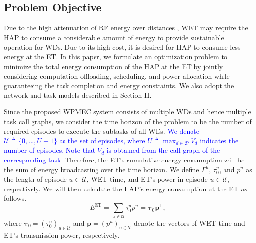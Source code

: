 \documentclass[12pt,draftclsnofoot,onecolumn]{IEEEtran}
\begin{document}
\subsection{Problem Objective}
Due to the high attenuation of RF energy over distances \cite{b8}, WET may require the HAP to consume a considerable amount of energy to provide sustainable operation for WDs. Due to its high cost, it is desired for HAP to consume less energy at the ET. In this paper, we formulate an optimization problem to minimize the total energy consumption of the HAP at the ET by jointly considering computation offloading, scheduling, and power allocation while guaranteeing the task completion and energy constraints. We also adopt the network and task models described in Section II.

Since the proposed WPMEC system consists of multiple WDs and hence multiple task call graphs, we consider the time horizon of the problem to be the number of required episodes to execute the subtasks of all WDs. \textcolor{blue}{We denote $\mathcal{U}\triangleq\{0,...,U-1\}$ as the set of episodes, where $U\triangleq\max_{d\in\mathcal{D}}V_d$  indicates the number of episodes. Note that $V_d$ is obtained from the call graph of the corresponding task.} Therefore, the ET's cumulative energy consumption will be the sum of energy broadcasting over the time horizon. We define $\Gamma^u$, $\tau_0^u$, and $p^u$ as the length of episode $u\in\mathcal{U}$, WET time, and ET's power in episode $u\in\mathcal{U}$, respectively. We will then calculate the HAP's energy consumption at the ET as follows.
\begin{equation}\label{eq2}
	E^{\text{ET}} = \sum_{u\in\mathcal{U}}\tau_0^up^u = \boldsymbol{\tau}_0\boldsymbol{p}^{\intercal},
\end{equation}
where $\boldsymbol{\tau}_0 = \left(\tau_0^u\right)_{u\in\mathcal{U}}$ and $\boldsymbol{p} = \left(p^u\right)_{u\in\mathcal{U}}$ denote the vectors of WET time and ET's transmission power, respectively.
\end{document}
